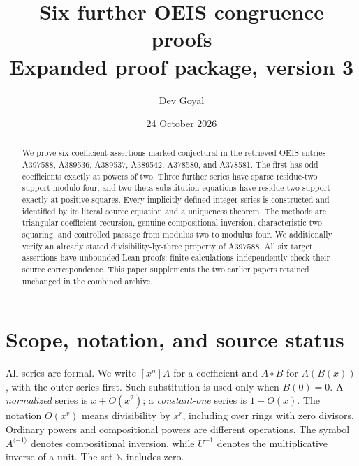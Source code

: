 \documentclass[11pt,a4paper]{article}
\title{Six further OEIS congruence proofs\\
  \large Expanded proof package, version 3}
\author{Dev Goyal}
\date{24 October 2026}
\theoremstyle{remark}
\newcommand{\N}{\mathbb N}
\newcommand{\rev}{^{\langle-1\rangle}}
\begin{document}
\maketitle

\begin{center}
\end{center}

\begin{abstract}
We prove six coefficient assertions marked conjectural in the retrieved
OEIS entries A397588, A389536, A389537, A389542, A378580, and A378581.
The first has odd coefficients exactly at powers of two. Three further
series have sparse residue-two support modulo four, and two theta
substitution equations have residue-two support exactly at positive
squares. Every implicitly defined integer series is constructed and
identified by its literal source equation and a uniqueness theorem.
The methods are triangular coefficient recursion, genuine compositional
inversion, characteristic-two squaring, and controlled passage from
modulus two to modulus four. We additionally verify an already stated
divisibility-by-three property of A397588. All six target assertions have
unbounded Lean proofs; finite calculations independently check their
source correspondence. This paper supplements the two earlier papers
retained unchanged in the combined archive.
\end{abstract}

\section{Scope, notation, and source status}

All series are formal. We write $[x^n]A$ for a coefficient and $A\circ B$
for $A(B(x))$, with the outer series first. Such substitution is used only
when $B(0)=0$. A \emph{normalized} series is $x+O(x^2)$; a
\emph{constant-one} series is $1+O(x)$. The notation $O(x^r)$ means
divisibility by $x^r$, including over rings with zero divisors. Ordinary
powers and compositional powers are different operations. The symbol
$A\rev$ denotes compositional inversion, while $U^{-1}$ denotes the
multiplicative inverse of a unit. The set $\N$ includes zero.
\end{document}

